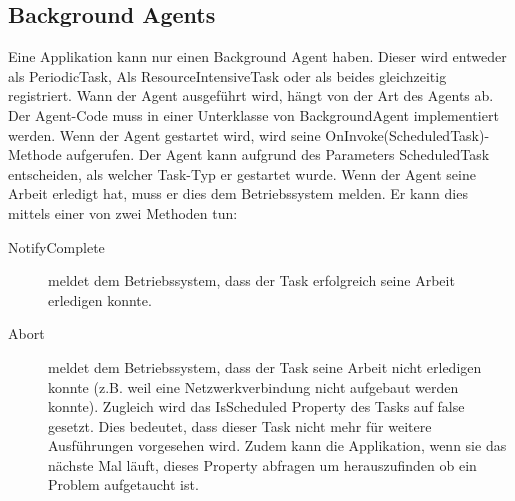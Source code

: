 \documentclass[a4paper,10pt]{scrreprt}
\begin{document}
\subsection{Background Agents}
Eine Applikation kann nur einen Background Agent haben. Dieser wird entweder als PeriodicTask, Als
ResourceIntensiveTask oder als beides gleichzeitig registriert. Wann der Agent ausgeführt wird, hängt von der
Art des Agents ab. Der Agent-Code muss in einer Unterklasse von BackgroundAgent implementiert werden.
Wenn der Agent gestartet wird, wird seine OnInvoke(ScheduledTask)-Methode aufgerufen. Der Agent kann
aufgrund des Parameters ScheduledTask entscheiden, als welcher Task-Typ er gestartet wurde. Wenn der Agent
seine Arbeit erledigt hat, muss er dies dem Betriebssystem melden. Er kann dies mittels einer von zwei
Methoden tun:
\begin{description}
 \item [NotifyComplete] meldet dem Betriebssystem, dass der Task erfolgreich seine Arbeit erledigen konnte.
 \item [Abort] meldet dem Betriebssystem, dass der Task seine Arbeit nicht erledigen konnte (z.B. weil eine
Netzwerkverbindung nicht aufgebaut werden konnte). Zugleich wird das IsScheduled Property des Tasks
auf false gesetzt. Dies bedeutet, dass dieser Task nicht mehr für weitere Ausführungen vorgesehen
wird. Zudem kann die Applikation, wenn sie das nächste Mal läuft, dieses Property abfragen um
herauszufinden ob ein Problem aufgetaucht ist.

\end{description}
\end{document}
